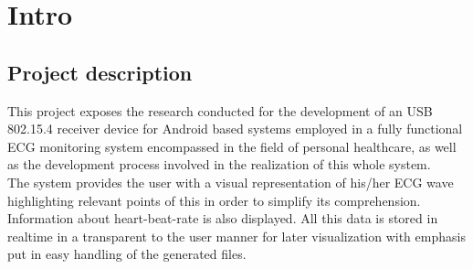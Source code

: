 \chapter{Intro}
\label{cha:intro}
	\section{Project description}

		This project exposes the research conducted for the development of an USB 802.15.4 receiver device for Android based systems employed in a fully functional ECG monitoring system encompassed in the field of personal healthcare, as well as the development process involved in the realization of this whole system.\\


		The system provides the user with a visual representation of his/her ECG wave highlighting relevant points of this in order to simplify its comprehension. Information about heart-beat-rate %
		is also displayed. All this data is stored in realtime in a transparent to the user manner for later visualization with emphasis put in easy handling of the generated files.\\

		\begin{comment}
		¿Qué es cada parte?
		Sistema 3 partes: nodo delineador, receptor 802.15.4 y app como frontend en general. En un parrafo distino para cada una explicar las tecnologías que hemos usado y porque. 

		¿Cómo se hizo cada parte?
		(Orden, android ->shimmer->msp430->dirigir texto hacia investigación(flecha = parrafo))
		Visualizador: Android ampliamente usado, facilidad para obtener un dispositivo, no demasiado coste (al menos < iOS), plataforma abierta, desarrollo comodo.
		Shimmer: reutiliza sistema desarrollado por la complu en colaboración con EPFL
		Receptor: 

		\end{comment}
		
